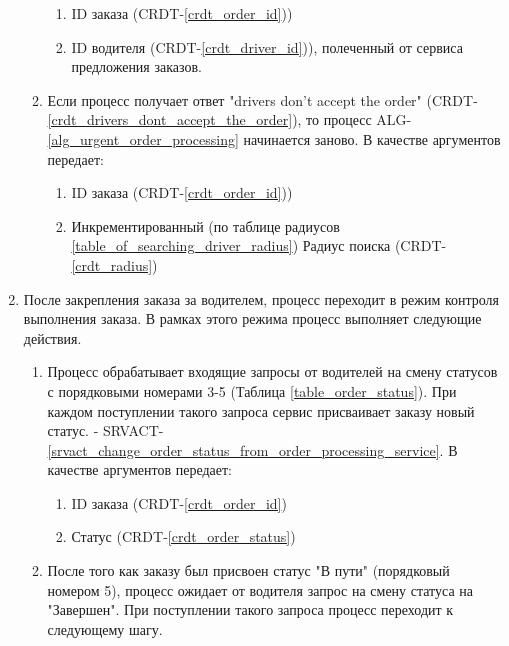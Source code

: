 \begin{alg}
\begin{enumerate}
\begin{enumerate}
           			\begin{enumerate}
             			\item ID заказа (CRDT-\ref{crdt_order_id}))
     					    \item ID водителя (CRDT-\ref{crdt_driver_id})), полеченный от сервиса предложения заказов.
             		\end{enumerate}

         			\item Если процесс получает ответ "drivers don't accept the order" (CRDT-\ref{crdt_drivers_dont_accept_the_order}), то процесс ALG-\ref{alg_urgent_order_processing} начинается заново. В качестве аргументов передает: 

           			\begin{enumerate}
             			\item ID заказа (CRDT-\ref{crdt_order_id}))
             			\item Инкрементированный (по таблице радиусов \ref{table_of_searching_driver_radius}) Радиус поиска (CRDT-\ref{crdt_radius})
           			\end{enumerate}
           			
         		\end{enumerate}

          \item После закрепления заказа за водителем, процесс переходит в режим контроля выполнения заказа. В рамках этого режима процесс выполняет следующие действия.

            \begin{enumerate}
              \item Процесс обрабатывает входящие запросы от водителей на смену статусов с порядковыми номерами 3-5 (Таблица \ref{table_order_status}). При каждом поступлении такого запроса сервис присваивает заказу новый статус. - SRVACT-\ref{srvact_change_order_status_from_order_processing_service}. В качестве аргументов передает: 

                \begin{enumerate}
                  \item ID заказа (CRDT-\ref{crdt_order_id})
                  \item Статус (CRDT-\ref{crdt_order_status})
                \end{enumerate} 

              \item После того как заказу был присвоен статус "В пути" (порядковый номером 5), процесс ожидает от водителя запрос на смену статуса на "Завершен". При поступлении такого запроса процесс переходит к следующему шагу.
            \end{enumerate}


\end{enumerate}
\end{alg}
